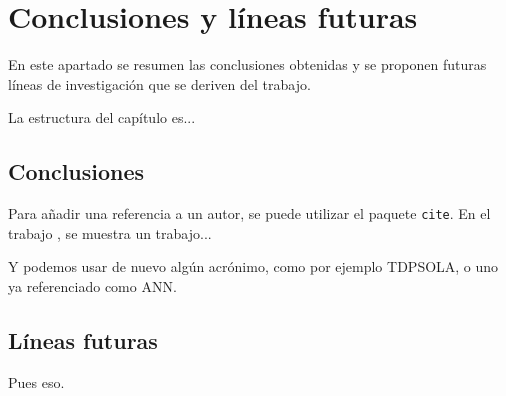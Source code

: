 %
%
%
% 
%
%
%
%

\chapter{Conclusiones y líneas futuras}
\label{cha:concl-y-line}

En este apartado se resumen las conclusiones obtenidas y se proponen
futuras líneas de investigación que se deriven del trabajo.

La estructura del capítulo es...


\section{Conclusiones}
\label{sec:conclusiones}

Para añadir una referencia a un autor, se puede utilizar el paquete
\texttt{cite}. En el trabajo \cite{armani03}, se muestra un trabajo...

Y podemos usar de nuevo algún acrónimo, como por ejemplo \ac{TDPSOLA}, o
uno ya referenciado como \ac{ANN}.


\section{Líneas futuras}
\label{sec:lineas-futuras}

Pues eso.





